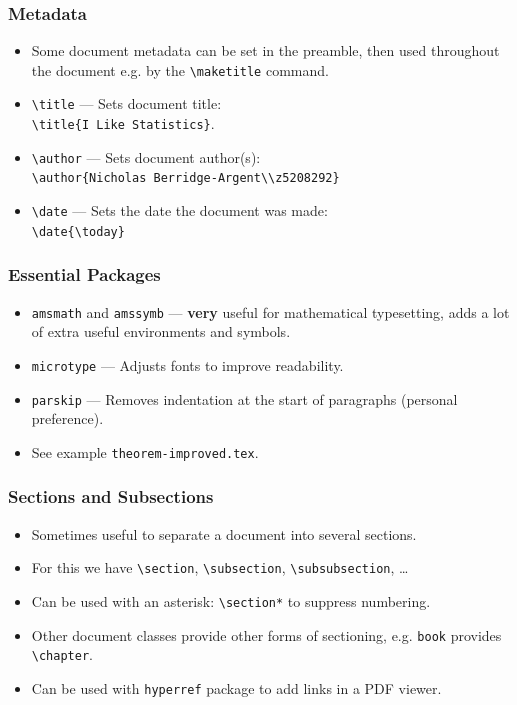 \documentclass{beamer}
\begin{document}
\begin{frame}
	\frametitle{Metadata}
	\begin{itemize}
		\item Some document metadata can be set in the preamble, then used throughout the document e.g. by the \texttt{\textbackslash{}maketitle} command.
		\item \texttt{\textbackslash{}title} --- Sets document title:\\\texttt{\textbackslash{}title\{I Like Statistics\}}.
		\item \texttt{\textbackslash{}author} --- Sets document author(s):\\\texttt{\textbackslash{}author\{Nicholas Berridge-Argent\textbackslash\textbackslash{}z5208292\}}
		\item \texttt{\textbackslash{}date} --- Sets the date the document was made:\\\texttt{\textbackslash{}date\{\textbackslash{}today\}}
	\end{itemize}
\end{frame}

\begin{frame}
	\frametitle{Essential Packages}
	\begin{itemize}
		\item \texttt{amsmath} and \texttt{amssymb} --- \textbf{very} useful for mathematical typesetting, adds a lot of extra useful environments and symbols.
		\item \texttt{microtype} --- Adjusts fonts to improve readability.
		\item \texttt{parskip} --- Removes indentation at the start of paragraphs (personal preference).
		\item See example \texttt{theorem-improved.tex}.
	\end{itemize}
\end{frame}

\begin{frame}
	\frametitle{Sections and Subsections}
	\begin{itemize}
		\item Sometimes useful to separate a document into several sections.
		\item For this we have \texttt{\textbackslash{}section}, \texttt{\textbackslash{}subsection}, \texttt{\textbackslash{}subsubsection}, \dots
		\item Can be used with an asterisk: \texttt{\textbackslash{}section*} to suppress numbering.
		\item Other document classes provide other forms of sectioning, e.g. \texttt{book} provides \texttt{\textbackslash{}chapter}.
		\item Can be used with \texttt{hyperref} package to add links in a PDF viewer.
	\end{itemize}
\end{frame}
\end{document}
